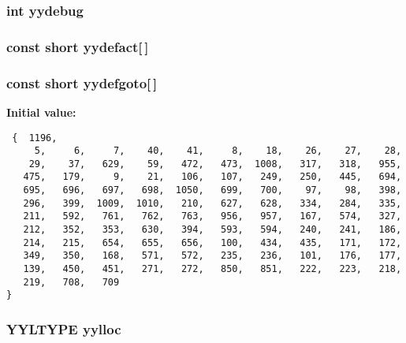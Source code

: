 \subsubsection{\setlength{\rightskip}{0pt plus 5cm}int yydebug}\label{parser_8c_a194}


\subsubsection{\setlength{\rightskip}{0pt plus 5cm}const short yydefact[$\,$]\hspace{0.3cm}{\tt  [static]}}\label{parser_8c_a184}


\subsubsection{\setlength{\rightskip}{0pt plus 5cm}const short yydefgoto[$\,$]\hspace{0.3cm}{\tt  [static]}}\label{parser_8c_a185}


{\bf Initial value:}

\footnotesize\begin{verbatim} {  1196,
     5,     6,     7,    40,    41,     8,    18,    26,    27,    28,
    29,    37,   629,    59,   472,   473,  1008,   317,   318,   955,
   475,   179,     9,    21,   106,   107,   249,   250,   445,   694,
   695,   696,   697,   698,  1050,   699,   700,    97,    98,   398,
   296,   399,  1009,  1010,   210,   627,   628,   334,   284,   335,
   211,   592,   761,   762,   763,   956,   957,   167,   574,   327,
   212,   352,   353,   630,   394,   593,   594,   240,   241,   186,
   214,   215,   654,   655,   656,   100,   434,   435,   171,   172,
   349,   350,   168,   571,   572,   235,   236,   101,   176,   177,
   139,   450,   451,   271,   272,   850,   851,   222,   223,   218,
   219,   708,   709
}\end{verbatim}\normalsize 
{}
\subsubsection{\setlength{\rightskip}{0pt plus 5cm}YYLTYPE yylloc}\label{parser_8c_a192}


